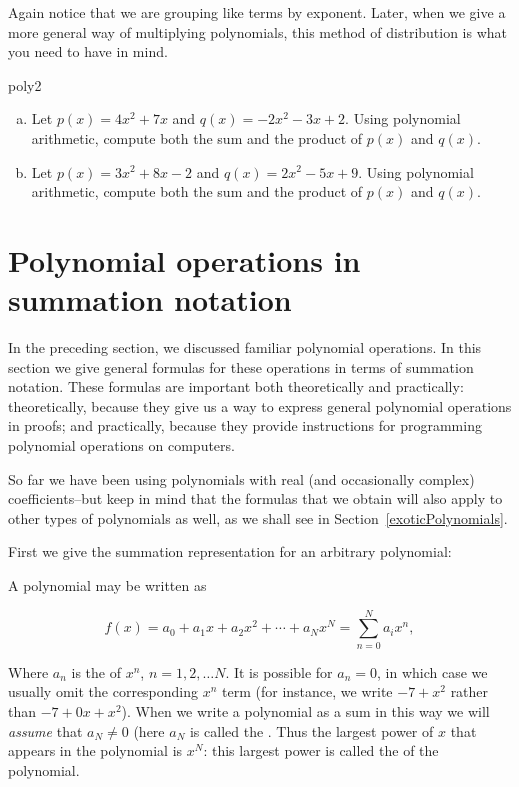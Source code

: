 Again notice that we are grouping like terms by exponent.  Later, when we give a more general way of multiplying polynomials, this method of distribution is what you need to have in mind.


\begin{exercise}{poly2}
\begin{enumerate}[(a)]
\item
Let $p(x)=4x^2+7x$ and $q(x)=-2x^2-3x+2$. Using polynomial arithmetic, compute both the sum and the product of $p(x)$ and $q(x)$.
\item
Let $p(x)=3x^2+8x-2$ and $q(x)=2x^2-5x+9$. Using polynomial arithmetic, compute both the sum and the product of $p(x)$ and $q(x)$. 
\end{enumerate}
\end{exercise}



\section{Polynomial operations in summation notation}\label{Polysum}

In the preceding section, we discussed familiar polynomial operations. In this section we give general formulas for these operations in terms of summation notation. These formulas are important both theoretically and practically: theoretically, because they give us a way to express general polynomial operations in proofs; and practically, because they provide instructions for programming polynomial operations on computers.

So far we have been using polynomials with real (and occasionally complex) coefficients--but keep in mind that the formulas that we obtain will also apply to  other types of polynomials as well, as we shall see in Section~\ref{exoticPolynomials}. 

 First we give the summation representation for an arbitrary polynomial: 

\begin{defn}\label{def:sumPoly}  A polynomial may be written as

\[f(x) = a_0 + a_1 x +a_2 x^2 + \cdots + a_N x^N = \sum^{N}_{n=0} a_i x^n, \]

Where $a_n$  is the   of $x^n$,  $n=1,2, \ldots N$. It is possible for $a_n = 0$, in which case we usually omit the corresponding $x^n$ term (for instance, we write $-7 + x^2 $ rather than $-7 + 0x +  x^2  $). When we write a polynomial as a sum in this way we will \emph{assume} that $a_N \neq 0$ (here $a_N$ is called the .  Thus the largest power of $x$ that appears in the polynomial is $x^N$: this largest power is called the  of the polynomial.
\end{defn}

